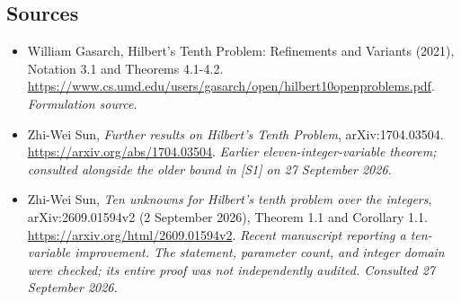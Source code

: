 \documentclass[11pt]{article}
\begin{document}
\subsection{Sources}
\begin{itemize}
\item[S1]William Gasarch, Hilbert's Tenth Problem: Refinements and Variants (2021), Notation 3.1 and Theorems 4.1-4.2.
\url{https://www.cs.umd.edu/users/gasarch/open/hilbert10openproblems.pdf}.
\textit{Formulation source.}
\item[E1]Zhi-Wei Sun, \emph{Further results on Hilbert's Tenth Problem},
arXiv:1704.03504.
\url{https://arxiv.org/abs/1704.03504}.
\textit{Earlier eleven-integer-variable theorem; consulted alongside
the older bound in [S1] on 27 September 2026.}
\item[E2]Zhi-Wei Sun, \emph{Ten unknowns for Hilbert's tenth problem
over the integers}, arXiv:2609.01594v2 (2 September 2026),
Theorem 1.1 and Corollary 1.1.
\url{https://arxiv.org/html/2609.01594v2}.
\textit{Recent manuscript reporting a ten-variable improvement. The
statement, parameter count, and integer domain were checked; its entire
proof was not independently audited. Consulted 27 September 2026.}

\end{itemize}
\end{document}
